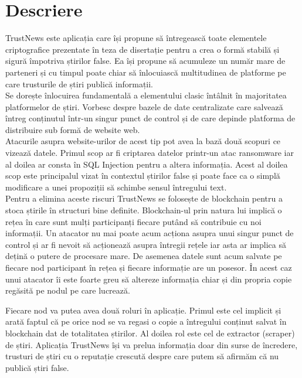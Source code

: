 
\section{Descriere}

TrustNews este aplicația care își propune să întregească toate elementele criptografice prezentate în teza de disertație pentru a crea o formă stabilă și sigură împotriva știrilor false. Ea își propune să acumuleze un număr mare de parteneri și cu timpul poate chiar să înlocuiască multitudinea de platforme pe care trusturile de știri publică informații.\\

Se dorește înlocuirea fundamentală a elementului clasic întâlnit în majoritatea platformelor de știri. Vorbesc despre bazele de date centralizate care salvează întreg conținutul într-un singur punct de control și de care depinde platforma de distribuire sub formă de website web.\\

Atacurile asupra website-urilor de acest tip pot avea la bază două scopuri ce vizează datele. Primul scop ar fi criptarea datelor printr-un atac ransomware iar al doilea ar consta în SQL Injection pentru a altera informația.
Acest al doilea scop este principalul vizat în contextul știrilor false și poate face ca o simplă modificare a unei propoziții să schimbe sensul întregului text.\\

Pentru a elimina aceste riscuri TrustNews se folosește de blockchain pentru a stoca știrile în structuri bine definite. Blockchain-ul prin natura lui implică o rețea în care sunt mulți participanți fiecare putând să contribuie cu noi informații. Un atacator nu mai poate acum acționa asupra unui singur punct de control și ar fi nevoit să acționează asupra întregii rețele iar asta ar implica să dețină o putere de procesare mare. De asemenea datele sunt acum salvate pe fiecare nod participant în rețea și fiecare informație are un posesor. În acest caz unui atacator îi este foarte greu să altereze informația chiar și din propria copie regăsită pe nodul pe care lucrează.\\

\clearpage

Fiecare nod va putea avea două roluri în aplicație. Primul este cel implicit și arată faptul că pe orice nod se va regasi o copie a întregului conținut salvat în blockchain dat de totalitatea știrilor. Al doilea rol este cel de extractor (scraper) de știri. Aplicația TrustNews își va prelua informația doar din surse de încredere, trusturi de știri cu o reputație crescută despre care putem să afirmăm că nu publică știri false.\\

